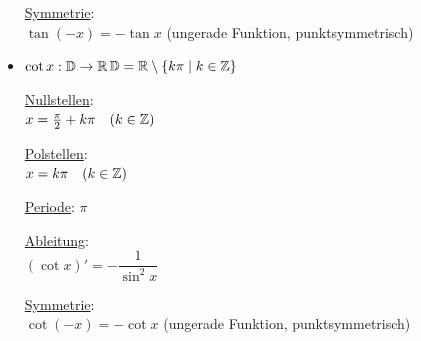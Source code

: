 \begin{itemize}
	\ul{Symmetrie}:\\
	$\tan(-x)=-\tan x$ (ungerade Funktion, punktsymmetrisch)
	
	\clearpage
	\item $\cot x:\mathbb{D}\to\mathbb{R}$\qquad $\mathbb{D}=\mathbb{R}\setminus\{k\pi\mid k\in\mathbb{Z}\}$
	
	\ul{Nullstellen}:\\
	$x=\frac{\pi}{2}+k\pi\quad(k\in\mathbb{Z})$
	
	\ul{Polstellen}:\\
	$x=k\pi\quad(k\in\mathbb{Z})$
	
	\ul{Periode}: $\pi$
	
	\ul{Ableitung}:\\
	$(\cot x)'=-\dfrac{1}{\sin^2x}$
	
	\ul{Symmetrie}:\\
	$\cot(-x)=-\cot x$ (ungerade Funktion, punktsymmetrisch)
\end{itemize}

\clearpage
